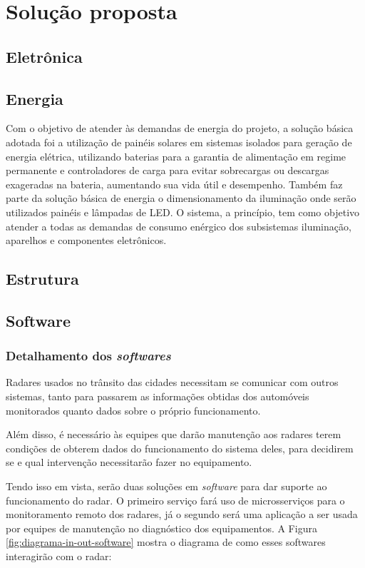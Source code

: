 \chapter{Solução proposta}
\section{Eletrônica}
\section{Energia}

Com o objetivo de atender às demandas de energia do projeto, a solução básica adotada foi a utilização de painéis solares em sistemas isolados para geração de energia elétrica, utilizando baterias para a garantia de alimentação em regime permanente e controladores de carga para evitar sobrecargas ou descargas exageradas na bateria, aumentando sua vida útil e desempenho. Também faz parte da solução básica de energia o dimensionamento da iluminação onde serão utilizados painéis e lâmpadas de LED. O sistema, a princípio, tem como objetivo atender a todas as demandas de consumo enérgico dos subsistemas iluminação, aparelhos e componentes eletrônicos.

\section{Estrutura}
\section{Software}

\subsection{Detalhamento dos \emph{softwares}}
Radares usados no trânsito das cidades necessitam se comunicar com outros sistemas, tanto para passarem as informações obtidas dos automóveis monitorados quanto dados sobre o próprio funcionamento.

Além disso, é necessário às equipes que darão manutenção aos radares terem condições de obterem dados do funcionamento do sistema deles, para decidirem se e qual intervenção necessitarão fazer no equipamento.

Tendo isso em vista, serão duas soluções em \emph{software} para dar suporte ao funcionamento do radar. O primeiro serviço fará uso de microsserviços para o monitoramento remoto dos radares, já o segundo será uma aplicação a ser usada por equipes de manutenção no diagnóstico dos equipamentos. A Figura \ref{fig:diagrama-in-out-software} mostra o diagrama de como esses softwares interagirão com o radar:

